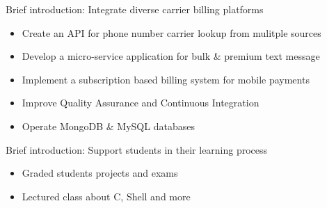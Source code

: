 \documentclass{resume}
\begin{document}
\begin{minipage}[t]{0.67\textwidth}
Brief introduction: Integrate diverse carrier billing platforms
\begin{itemize}
  \item Create an API for phone number carrier lookup from mulitple sources
  \item Develop a micro-service application for bulk \& premium text message
  \item Implement a subscription based billing system for mobile payments
  \item Improve Quality Assurance and Continuous Integration
  \item Operate MongoDB \& MySQL databases
\end{itemize}

Brief introduction: Support students in their learning process
\begin{itemize}
  \item Graded students projects and exams
  \item Lectured class about C, Shell and more
\end{itemize}

\end{minipage}
\end{document}
